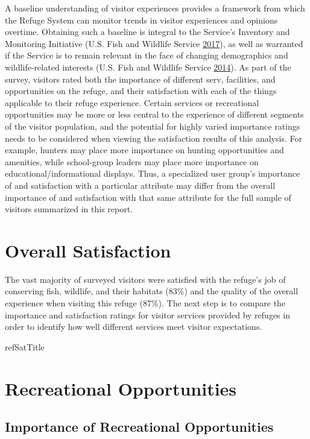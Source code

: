 \documentclass[]{book}
\let\BeginKnitrBlock\begin \let\EndKnitrBlock\end
\begin{document}
\BeginKnitrBlock{preamble1}
A baseline understanding of visitor experiences provides a framework
from which the Refuge System can monitor trends in visitor experiences
and opinions overtime. Obtaining such a baseline is integral to the
Service's Inventory and Monitoring Initiative (U.S. Fish and Wildlife
Service \protect\hyperlink{ref-USFWS2017}{2017}), as well as warranted
if the Service is to remain relevant in the face of changing
demographics and wildlife-related interests (U.S. Fish and Wildlife
Service \protect\hyperlink{ref-USFWS2014}{2014}). As part of the survey,
visitors rated both the importance of different serv, facilities, and
opportunities on the refuge, and their satisfaction with each of the
things applicable to their refuge experience. Certain services or
recreational opportunities may be more or less central to the experience
of different segments of the visitor population, and the potential for
highly varied importance ratings needs to be considered when viewing the
satisfaction results of this analysis. For example, hunters may place
more importance on hunting opportunities and amenities, while
school-group leaders may place more importance on
educational/informational displays. Thus, a specialized user group's
importance of and satisfaction with a particular attribute may differ
from the overall importance of and satisfaction with that same attribute
for the full sample of visitors summarized in this report.
\EndKnitrBlock{preamble1}

\section{Overall Satisfaction}\label{overall-satisfaction}

The vast majority of surveyed visitors were satisfied with the refuge's
job of conserving fish, wildlife, and their habitats (83\%) and the
quality of the overall experience when visiting this refuge (87\%). The
next step is to compare the importance and satisfaction ratings for
visitor services provided by refuges in order to identify how well
different services meet visitor expectations.

refSatTitle

\section{Recreational Opportunities}\label{recreational-opportunities}

\subsection{Importance of Recreational
Opportunities}\label{importance-of-recreational-opportunities}
\end{document}
